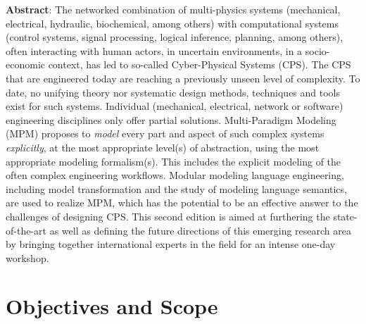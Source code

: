 \noindent
\textbf{Abstract}: The networked combination of multi-physics systems (mechanical, 
electrical, hydraulic, biochemical, among others) with computational systems 
(control systems, signal processing, logical inference, planning, among others), 
often interacting with human actors, in uncertain environments, in a socio-economic 
context, has led to so-called Cyber-Physical Systems (CPS).
The CPS that are engineered today are reaching a previously unseen level of 
complexity.
To date, no unifying theory nor systematic design methods, techniques and tools 
exist for such systems.
Individual (mechanical, electrical, network or software) engineering disciplines 
only offer partial solutions.
Multi-Paradigm Modeling (MPM) proposes to \emph{model} every part and aspect of 
such complex systems \emph{explicitly}, at the most appropriate level(s) of 
abstraction, using the most appropriate modeling formalism(s).
This includes the explicit modeling of the often complex engineering workflows.
Modular modeling language engineering, including model transformation and the 
study of modeling language semantics, are used to realize MPM, which has the 
potential to be an effective answer to the challenges of designing CPS.
This second edition is aimed at furthering the state-of-the-art as well as 
defining the future directions of this emerging research area by bringing together 
international experts in the field for an intense one-day workshop.

\section{Objectives and Scope}


